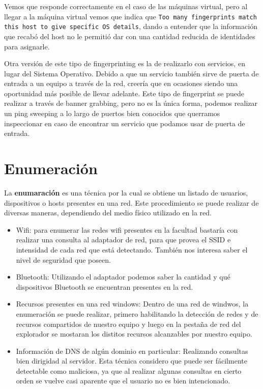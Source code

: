 Vemos que responde correctamente en el caso de las máquinas virtual, pero al llegar a la máquina virtual vemos que indica que \texttt{Too many fingerprints match this host to give specific OS details}, dando a entender que la información que recabó del host no le permitió dar con una cantidad reducida de identidades para asignarle.

Otra versión de este tipo de fingerprinting es la de realizarlo con servicios, en lugar del Sistema Operativo. Debido a que un servicio también sirve de puerta de entrada a un equipo a través de la red, creería que en ocasiones siendo una oportunidad más posible de llevar adelante. Este tipo de fingerprint se puede realizar a través de banner grabbing, pero no es la única forma, podemos realizar un ping sweeping a lo largo de puertos bien conocidos que querramos inspeccionar en caso de encontrar un servicio que podamos usar de puerta de entrada.

\section*{Enumeración}

La \textbf{enumaración} es una técnica por la cual se obtiene un listado de usuarios, dispositivos o hosts presentes en una red. Este procedimiento se puede realizar de diversas maneras, dependiendo del medio físico utilizado en la red.

\begin{itemize}
    \item Wifi: para enumerar las redes wifi presentes en la facultad bastaría con realizar una consulta al adaptador de red, para que provea el SSID e intensidad de cada red que está detectando. También nos interesa saber el nivel de seguridad que poseen.
    \item Bluetooth: Utilizando el adaptador podemos saber la cantidad y qué dispositivos Bluetooth se encuentran presentes en la red.
    \item Recursos presentes en una red windows: Dentro de una red de windwos, la enumeración se puede realizar, primero habilitando la detección de redes y de recursos compartidos de nuestro equipo y luego en la pestaña de red del explorador se mostaran los distitos recursos alcanzables por nuestro equipo.
    \item Información de DNS de algún dominio en particular: Realizando consultas bien dirigidad al servidor. Esta técnica considero que puede ser fácilmente detectable como maliciosa, ya que al realizar algunas consultas en cierto orden se vuelve casi aparente que el usuario no es bien intencionado.
\end{itemize}

